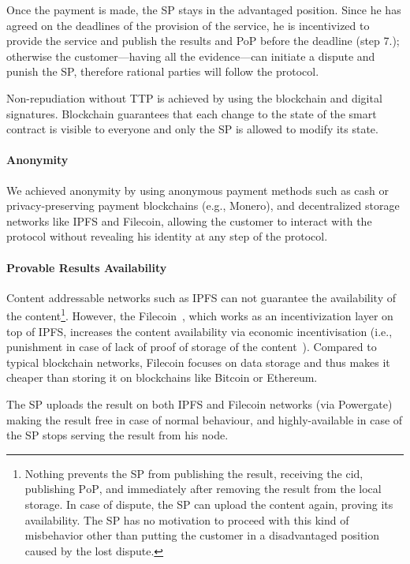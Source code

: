 \documentclass[pdftex,twocolumn,epjc3]{svjour3}
\begin{document}
{Once the payment is made, the SP stays in the advantaged position. Since he has agreed on the deadlines of the provision of the service, he is incentivized
to provide the service and publish the results and PoP before the deadline (step 7.); otherwise the customer—having all the evidence—can initiate a dispute and punish the SP, therefore rational parties will follow the protocol.

Non-repudiation without TTP is achieved by using the blockchain and digital signatures. Blockchain guarantees that each change to the state of the smart contract is visible to everyone and only the SP is allowed to modify its state. 

\paragraph{Anonymity}
We achieved anonymity by using anonymous payment methods such as cash or privacy-preserving payment blockchains (e.g., Monero), and decentralized storage networks like IPFS and Filecoin, allowing the customer to interact with the protocol without revealing his identity at any step of the protocol.

\paragraph{Provable Results Availability}
Content addressable networks such as IPFS can not guarantee the availability of the content\footnote{Nothing prevents the SP from publishing the result, receiving the $\mathrm{cid}$, publishing $\mathrm{PoP}$, and immediately after removing the result from the local storage. In case of dispute, the SP can upload the content again, proving its availability. The SP has no motivation to proceed with this kind of misbehavior other than putting the customer in a disadvantaged position caused by the lost dispute.}. However, the Filecoin~\cite{protocollabsFilecoinDecentralizedStorage2017}, which works as an incentivization layer on top of IPFS, increases the content availability via economic incentivisation (i.e., punishment in case of lack of proof of storage of the content~\cite{filecoinSlashing}). Compared to typical blockchain networks, Filecoin focuses on data storage and thus makes it cheaper than storing it on blockchains like Bitcoin or Ethereum.

The SP uploads the result on both IPFS and Filecoin networks (via Powergate) making the result free in case of normal behaviour, and highly-available in case of the SP stops serving the result from his node. 

}
\end{document}
